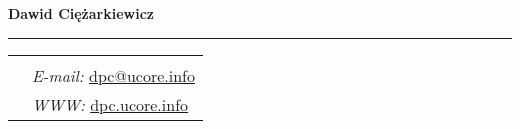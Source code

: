 \documentclass[10pt]{article}
\newcommand{\makeheading}[1]%
        {\hspace*{-\marginparsep minus \marginparwidth}%
         \begin{minipage}[t]{\textwidth+\marginparwidth+\marginparsep}%
                {\large \bfseries #1}\\[-0.15\baselineskip]%
                 \rule{\columnwidth}{1pt}%
         \end{minipage}}
\renewcommand{\section}[2]%
        {\pagebreak[2]\vspace{1.4\baselineskip}%
         \phantomsection\addcontentsline{toc}{section}{#1}%
         \hspace{0in}%
         \marginpar{
         \raggedright \scshape #1}#2}
\begin{document}
\makeheading{Dawid Ciężarkiewicz}


%
%
%
\newlength{\rcollength}\setlength{\rcollength}{1.85in}%
%
\begin{tabular}[t]{@{}p{\textwidth-\rcollength}p{\rcollength}}

&
}

\\

& \textit{E-mail:}
\href{mailto:dpc@ucore.info}{dpc@ucore.info}\\
   & \textit{WWW:}
\href{http://dpc.ucore.info/}{dpc.ucore.info}\\
\end{tabular}


%
\end{document}
